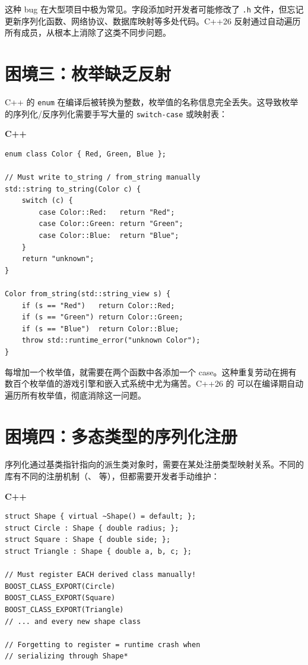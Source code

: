 \documentclass[12pt,a4paper,fontset=fandol]{ctexbook}
\newcommand{\cpplabel}{%
  \noindent\begin{tcolorbox}[colback=algheadbg,coltext=white,
    sharp corners,boxrule=0pt,width=3.0em,height=1.4em,
    halign=center,valign=center,nobeforeafter,left=0pt,right=0pt,
    top=0pt,bottom=0pt]\small\bfseries C++\end{tcolorbox}}
\begin{document}
\begin{warning}[title={不同步的代价}]
这种 bug 在大型项目中极为常见。字段添加时开发者可能修改了 \texttt{.h} 文件，但忘记更新序列化函数、网络协议、数据库映射等多处代码。C++26 反射通过自动遍历所有成员，从根本上消除了这类不同步问题。
\end{warning}

\section{困境三：枚举缺乏反射}\label{sec:no-enum}

C++ 的 \texttt{enum} 在编译后被转换为整数，枚举值的名称信息完全丢失。这导致枚举的序列化/反序列化需要手写大量的 \texttt{switch-case} 或映射表：

\cpplabel
\begin{lstlisting}[caption={C++26 前: 枚举序列化需要手写映射}]
enum class Color { Red, Green, Blue };

// Must write to_string / from_string manually
std::string to_string(Color c) {
    switch (c) {
        case Color::Red:   return "Red";
        case Color::Green: return "Green";
        case Color::Blue:  return "Blue";
    }
    return "unknown";
}

Color from_string(std::string_view s) {
    if (s == "Red")   return Color::Red;
    if (s == "Green") return Color::Green;
    if (s == "Blue")  return Color::Blue;
    throw std::runtime_error("unknown Color");
}
\end{lstlisting}

每增加一个枚举值，就需要在两个函数中各添加一个 case。这种重复劳动在拥有数百个枚举值的游戏引擎和嵌入式系统中尤为痛苦。C++26 的  可以在编译期自动遍历所有枚举值，彻底消除这一问题。

\section{困境四：多态类型的序列化注册}\label{sec:poly-register}

序列化通过基类指针指向的派生类对象时，需要在某处注册类型映射关系。不同的库有不同的注册机制（、 等），但都需要开发者手动维护：

\cpplabel
\begin{lstlisting}[caption={C++26 前: 多态序列化需要手动注册}]
struct Shape { virtual ~Shape() = default; };
struct Circle : Shape { double radius; };
struct Square : Shape { double side; };
struct Triangle : Shape { double a, b, c; };

// Must register EACH derived class manually!
BOOST_CLASS_EXPORT(Circle)
BOOST_CLASS_EXPORT(Square)
BOOST_CLASS_EXPORT(Triangle)
// ... and every new shape class

// Forgetting to register = runtime crash when
// serializing through Shape*
\end{lstlisting}
\end{document}
